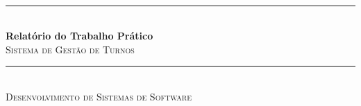 \documentclass[12pt,a4paper]{report}
\begin{document}

\begin{titlepage} %
	\newcommand{\HRule}{\rule{\linewidth}{0.5mm}} %
	
	\center %
	
		\vspace{5.0cm}
	\textsc{\LARGE }\\[1.5cm] %

	

	
	
	\HRule\\[0.4cm]
	
	{\huge\bfseries Relatório do Trabalho Prático}\\[0.4cm] %
    \textsc{\large Sistema de Gestão de Turnos}\\[0.5cm]
	
	\HRule\\[0cm]
	\textsc{\large Desenvolvimento de Sistemas de Software}\\[0.5cm] %
	\vspace{4.0cm}
	\date{}
 


\end{titlepage}
\end{document}
